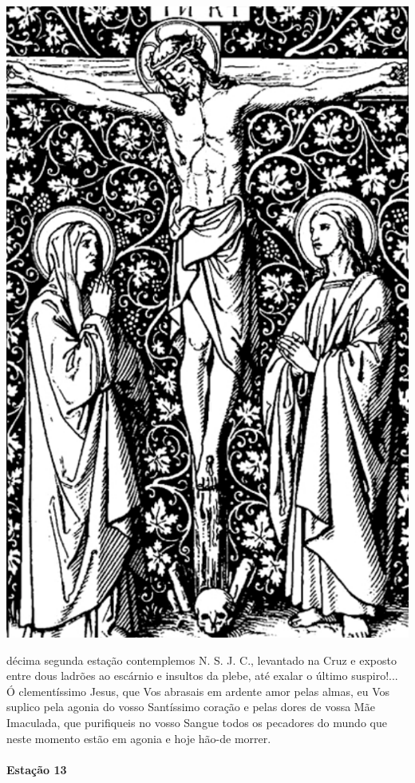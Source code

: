 \begin{nscenter}
\includegraphics[width=.8\textwidth, height=.8\textheight, keepaspectratio]{media/station12}
\end{nscenter}

 décima segunda estação contemplemos N. S. J. C., levantado na Cruz e exposto entre dous ladrões ao escárnio e insultos da plebe, até exalar o último suspiro!...
Ó clementíssimo Jesus, que Vos abrasais em ardente amor pelas almas, eu Vos suplico pela agonia do vosso Santíssimo coração e pelas dores de vossa Mãe Imaculada, que purifiqueis no vosso Sangue todos os pecadores do mundo que neste momento estão em agonia e hoje hão-de morrer.

\newpage

\paragraph{Estação 13}

